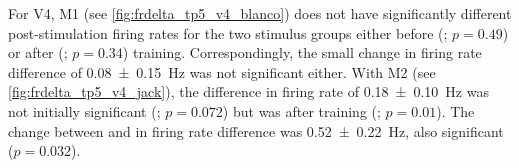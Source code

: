 %

\begin{figure}[htbp]%
    \centering
    \hspace*{\fill}
    \hspace*{\fill}\hspace{.2cm}\hspace*{\fill}
    \hspace*{\fill}
    \caption{
    \label{fig:frdelta_tp5_v4}
}
\end{figure}

For \ac{V4}, \ac{M1} (see \autoref{fig:frdelta_tp5_v4_blanco}) does not have significantly different post-stimulation firing rates for the two stimulus groups either before (; $p=0.49$) or after (; $p=0.34$) training.
Correspondingly, the small change in firing rate difference of \SI{+0.08\pm0.15}{Hz} was not significant either.
With \ac{M2} (see \autoref{fig:frdelta_tp5_v4_jack}), the difference in firing rate of \SI{+0.18\pm0.10}{Hz} was not initially significant (; $p=0.072$) but was after training (; $p=0.01$).
The change between  and  in firing rate difference was \SI{+0.52\pm0.22}{Hz}, also significant ($p=0.032$).


